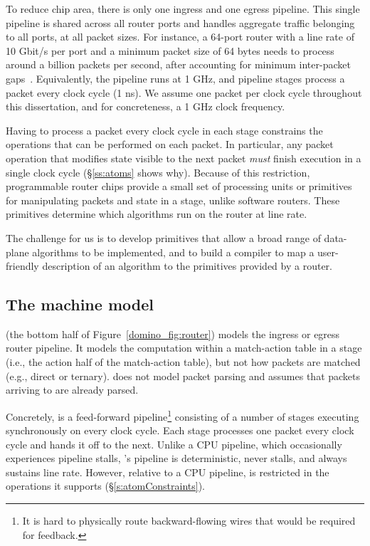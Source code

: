 To reduce chip area, there is only one ingress and one egress pipeline.  This
single pipeline is shared across all router ports and handles aggregate traffic
belonging to all ports, at all packet sizes.  For instance, a 64-port router
with a line rate of 10 Gbit/s per port and a minimum packet size of 64 bytes
needs to process around a billion packets per second, after accounting for
minimum inter-packet gaps~\cite{rmt}.  Equivalently, the pipeline runs at 1
GHz, and pipeline stages process a packet every clock cycle (1 ns).  We assume
one packet per clock cycle throughout this dissertation, and for concreteness, a
1 GHz clock frequency.

Having to process a packet every clock cycle in each stage constrains
the operations that can be performed on each packet. In particular, any packet
operation that modifies state visible to the next packet {\em must} finish
execution in a single clock cycle (\S\ref{ss:atoms} shows why). Because
of this restriction, programmable router chips provide a small set of
processing units or primitives for manipulating packets and state in a stage,
unlike software routers. These primitives determine which algorithms
run on the router at line rate.

The challenge for us is to develop primitives that allow a broad range of
data-plane algorithms to be implemented, and to build a compiler to map a
user-friendly description of an algorithm to the primitives provided by a
router.

\subsection{The \absmachine machine model}

\absmachine (the bottom half of Figure~\ref{domino_fig:router}) models
the ingress or egress router pipeline.  It models the
computation within a match-action table in a stage (i.e., the action half of
the match-action table), but not how packets are matched (e.g., direct or
ternary). \absmachine does not model packet parsing and assumes
that packets arriving to \absmachine are already parsed.

 Concretely, \absmachine is a feed-forward pipeline\footnote{It is hard to
physically route backward-flowing wires that would be required for feedback.}
consisting of a number of stages executing synchronously on every clock cycle.
Each stage processes one packet every clock cycle and hands it off to the next.
Unlike a CPU pipeline, which occasionally experiences pipeline stalls,
\absmachine's pipeline is deterministic, never stalls, and always sustains line
rate. However, relative to a CPU pipeline, \absmachine is restricted in the
operations it supports (\S\ref{s:atomConstraints}).

